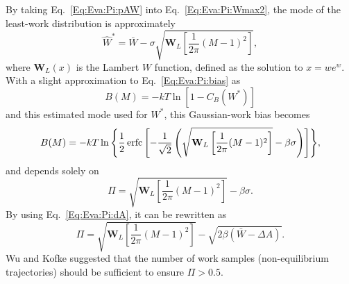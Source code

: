 By taking Eq.~\ref{Eq:Eva:Pi:pAW} into Eq.~\ref{Eq:Eva:Pi:Wmax2}, the mode of the least-work distribution is approximately
\begin{equation}
    \hat{W}^\ast=\bar{W}-\sigma\sqrt{\mathbf{W}_L\left[\frac{1}{2\pi}(M-1)^2\right]},
\end{equation}
where $\mathbf{W}_L(x)$ is the Lambert $W$ function, defined as the solution to $x=we^w$. With a slight approximation to Eq.~\ref{Eq:Eva:Pi:bias} as
\begin{equation}
    B(M)=-kT\ln{[1-C_B(W^\ast)]}
\end{equation}
and this estimated mode used for $W^\ast$, this Gaussian-work bias becomes
\begin{equation}
    B(M)=-kT\ln{\left\{\frac{1}{2}\operatorname{erfc}\left[-\frac{1}{\sqrt{2}}\left(\sqrt{\mathbf{W}_L\left[\frac{1}{2\pi}(M-1)^2\right]}-\beta\sigma\right)\right]\right\}},
\end{equation}
and depends solely on
\begin{equation}
    \Pi=\sqrt{\mathbf{W}_L\left[\frac{1}{2\pi}(M-1)^2\right]}-\beta\sigma.
\end{equation}
By using Eq.~\ref{Eq:Eva:Pi:dA}, it can be rewritten as
\begin{equation}
\Pi=\sqrt{\mathbf{W}_L\left[\frac{1}{2\pi}(M-1)^2\right]}-\sqrt{2\beta(\bar{W}-\Delta A)}.
\end{equation}
Wu and Kofke suggested that the number of work samples (non-equilibrium trajectories) should be sufficient to ensure $\Pi>0.5$.\cite{WuJCP2004}
